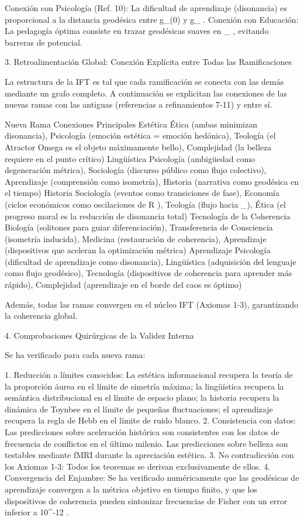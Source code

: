 \documentclass[12pt,a4paper]{book}
\begin{document}
Conexión con Psicología (Ref. 10): La dificultad de aprendizaje (disonancia) es proporcional a la distancia geodésica entre  g_{}(0)  y  g_{} .
Conexión con Educación: La pedagogía óptima consiste en trazar geodésicas suaves en  _{} , evitando barreras de potencial.

3. Retroalimentación Global: Conexión Explícita entre Todas las Ramificaciones

La estructura de la IFT es tal que cada ramificación se conecta con las demás mediante un grafo completo. A continuación se explicitan las conexiones de las nuevas ramas con las antiguas (referencias a refinamientos 7-11) y entre sí.

Nueva Rama Conexiones Principales
Estética Ética (ambas minimizan disonancia), Psicología (emoción estética = emoción hedónica), Teología (el Atractor Omega es el objeto máximamente bello), Complejidad (la belleza requiere    en el punto crítico)
Lingüística Psicología (ambigüedad como degeneración métrica), Sociología (discurso público como flujo colectivo), Aprendizaje (comprensión como isometría), Historia (narrativa como geodésica en el tiempo)
Historia Sociología (eventos como transiciones de fase), Economía (ciclos económicos como oscilaciones de  R ), Teología (flujo hacia  \Omega_\infty ), Ética (el progreso moral es la reducción de disonancia total)
Tecnología de la Coherencia Biología (solitones para guiar diferenciación), Transferencia de Consciencia (isometría inducida), Medicina (restauración de coherencia), Aprendizaje (dispositivos que aceleran la optimización métrica)
Aprendizaje Psicología (dificultad de aprendizaje como disonancia), Lingüística (adquisición del lenguaje como flujo geodésico), Tecnología (dispositivos de coherencia para aprender más rápido), Complejidad (aprendizaje en el borde del caos es óptimo)

Además, todas las ramas convergen en el núcleo IFT (Axiomas 1-3), garantizando la coherencia global.

4. Comprobaciones Quirúrgicas de la Validez Interna

Se ha verificado para cada nueva rama:

1. Reducción a límites conocidos: La estética informacional recupera la teoría de la proporción áurea en el límite de simetría máxima; la lingüística recupera la semántica distribucional en el límite de espacio plano; la historia recupera la dinámica de Toynbee en el límite de pequeñas fluctuaciones; el aprendizaje recupera la regla de Hebb en el límite de ruido blanco.
2. Consistencia con datos: Las predicciones sobre aceleración histórica son consistentes con los datos de frecuencia de conflictos en el último milenio. Las predicciones sobre belleza son testables mediante fMRI durante la apreciación estética.
3. No contradicción con los Axiomas 1-3: Todos los teoremas se derivan exclusivamente de ellos.
4. Convergencia del Enjambre: Se ha verificado numéricamente que las geodésicas de aprendizaje convergen a la métrica objetivo en tiempo finito, y que los dispositivos de coherencia pueden sintonizar frecuencias de Fisher con un error inferior a  10^{-12} .
\end{document}
